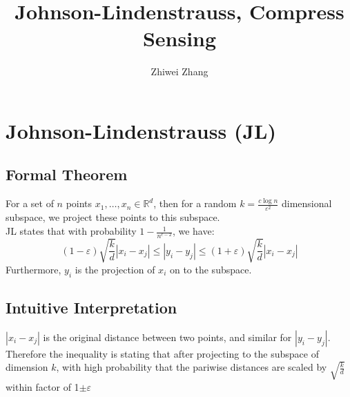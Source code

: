 \documentclass[12pt]{article}
\begin{document}
 
 
 
\title{Johnson-Lindenstrauss, Compress Sensing}
\author{Zhiwei Zhang}
 
\maketitle

\section{Johnson-Lindenstrauss (JL)}
\subsection{Formal Theorem}
For a set of $n$ points $x _ { 1 } , \ldots , x _ { n } \in \mathbb { R } ^ { d }$, then for a random $k = \frac { c \log n } { \varepsilon ^ { 2 } }$ dimensional subspace, we project these points to this subspace. \\
\newline 
JL states that with probability $1 - \frac { 1 } { n ^ { c - 2 } }$, we have:
$$
( 1 - \varepsilon ) \sqrt { \frac { k } { d } } \left| x _ { i } - x _ { j } \right| \leq \left| y _ { i } - y _ { j } \right| \leq ( 1 + \varepsilon ) \sqrt { \frac { k } { d } } \left| x _ { i } - x _ { j } \right|
$$
Furthermore, $y_i$ is the projection of $x_i$ on to the subspace.
\subsection{Intuitive Interpretation}
$|x_i - x_j|$ is the original distance between two points, and similar for  $|y_i - y_j|$. Therefore the inequality is stating that after projecting to the subspace of dimension $k$, with high probability that the pariwise distances are scaled by $\sqrt{\frac{k}{d}}$ within factor of 1$\pm \varepsilon$
\end{document}
